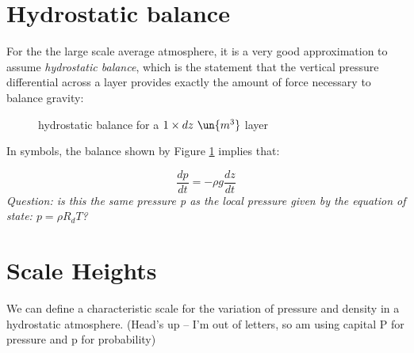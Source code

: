 \documentclass[12pt]{article}
\begin{document}
\section{Hydrostatic balance}


For the the large scale average atmosphere, it is a very good approximation to
assume \textit{hydrostatic balance}, which is the statement that 
the vertical pressure differential across a layer provides exactly the
amount of force necessary to balance gravity:

  \begin{figure}[H]
    \begin{center}
       
      \caption{hydrostatic balance for a $1 \times dz\  \un{m^3}$ layer}
      \label{fig:hydro}
    \end{center}
  \end{figure}

\vspace{0.1in}

In symbols, the balance shown by Figure \ref{fig:hydro} implies that:

\begin{equation}
  \label{eq:hydro}
  \frac{dp}{dt} = - \rho g \frac{dz}{dt}
\end{equation}
\textit{Question:  is this the same pressure p as the local pressure given by the equation of state: $p=\rho R_d T$?}

\section{Scale Heights}
\label{sec:scale-heights}

We can define a characteristic scale for the variation of pressure and density in a hydrostatic atmosphere. 
(Head's up -- I'm out of letters, so am using capital P for pressure and p for probability)
\end{document}
